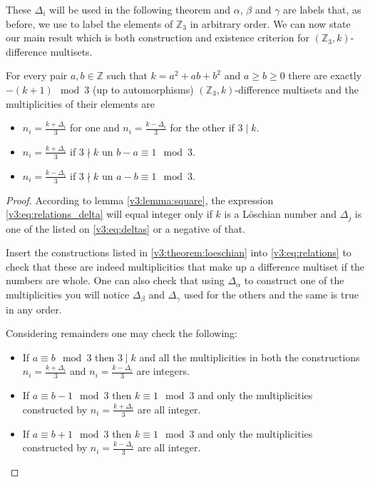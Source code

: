     These $\Delta_i$ will be used in the following theorem and $\alpha$, $\beta$ and $\gamma$ are labels that, as before, we use to label the elements of $\mathbb Z_3$ in arbitrary order. We can now state our main result which is both construction and existence criterion for $(\mathbb Z_3,k)$-difference multisets.

    \begin{theorem}
        \label{v3:theorem:loeschian}
        For every pair $a,b \in \mathbb Z$ such that $k=a^2+ab+b^2$ and $a \geq b \geq 0$ there are exactly $-(k+1) \mod 3$ (up to automorphisms) $(\mathbb Z_3,k)$-difference multisets and the multiplicities of their elements are
        
        \begin{itemize}
            \item $n_i=\frac{k+\Delta_i}{3}$ for one and $n_i=\frac{k-\Delta_i}{3}$ for the other if $3 \mid k$.
            \item $n_i=\frac{k+\Delta_i}{3}$ if $3 \nmid k$ un $b-a \equiv 1 \mod 3$.
            \item $n_i=\frac{k-\Delta_i}{3}$ if $3 \nmid k$ un $a-b \equiv 1 \mod 3$.
        \end{itemize}
    \end{theorem}

    \begin{proof}
        According to lemma \ref{v3:lemma:square}, the expression \eqref{v3:eq:relations_delta} will equal integer only if $k$ is a Löschian number and $\Delta_j$ is one of the listed on \eqref{v3:eq:deltas} or a negative of that.
        
        Insert the constructions listed in \eqref{v3:theorem:loeschian} into \eqref{v3:eq:relations} to check that these are indeed multiplicities that make up a difference multiset if the numbers are whole. One can also check that using $\Delta_\alpha$ to construct one of the multiplicities you will notice $\Delta_\beta$ and $\Delta_\gamma$ used for the others and the same is true in any order.
        
        Considering remainders one may check the following:
        \begin{itemize}
            \item If $a \equiv b \mod 3$ then $3 \mid k$ and all the multiplicities in both the constructions $n_i=\frac{k+\Delta_i}{3}$ and $n_i=\frac{k-\Delta_i}{3}$ are integers.
            \item If $a \equiv b-1 \mod 3$ then $k \equiv 1 \mod 3$ and only the multiplicities constructed by $n_i=\frac{k+\Delta_i}{3}$ are all integer.
            \item If $a \equiv b+1 \mod 3$ then $k \equiv 1 \mod 3$ and only the multiplicities constructed by $n_i=\frac{k-\Delta_i}{3}$ are all integer.
        \end{itemize}
    \end{proof}

